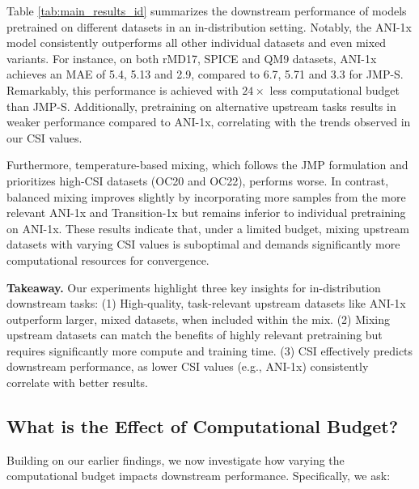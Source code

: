 



Table \ref{tab:main_results_id} summarizes the downstream performance of models pretrained on different datasets in an in-distribution setting. Notably, the ANI-1x model consistently outperforms all other individual datasets and even mixed variants. For instance, on both rMD17, SPICE and QM9 datasets, ANI-1x achieves an MAE of 5.4, 5.13 and 2.9, compared to 6.7, 5.71 and 3.3 for JMP-S. Remarkably, this performance is achieved with \( 24\times \) less computational budget than JMP-S. Additionally, pretraining on alternative upstream tasks results in weaker performance compared to ANI-1x, correlating with the trends observed in our CSI values.

Furthermore, temperature-based mixing, which follows the JMP formulation and prioritizes high-CSI datasets (OC20 and OC22), performs worse. In contrast, balanced mixing improves slightly by incorporating more samples from the more relevant ANI-1x and Transition-1x but remains inferior to individual pretraining on ANI-1x. These results indicate that, under a limited budget, mixing upstream datasets with varying CSI values is suboptimal and demands significantly more computational resources for convergence.


\textbf{Takeaway.} Our experiments highlight three key insights for in-distribution downstream tasks: (1) High-quality, task-relevant upstream datasets like ANI-1x outperform larger, mixed datasets, when included within the mix. (2) Mixing upstream datasets can match the benefits of highly relevant pretraining but requires significantly more compute and training time.  (3) CSI effectively predicts downstream performance, as lower CSI values (e.g., ANI-1x) consistently correlate with better results.



\subsection{What is the Effect of Computational Budget?}

Building on our earlier findings, we now investigate how varying the computational budget impacts downstream performance. Specifically, we ask:

